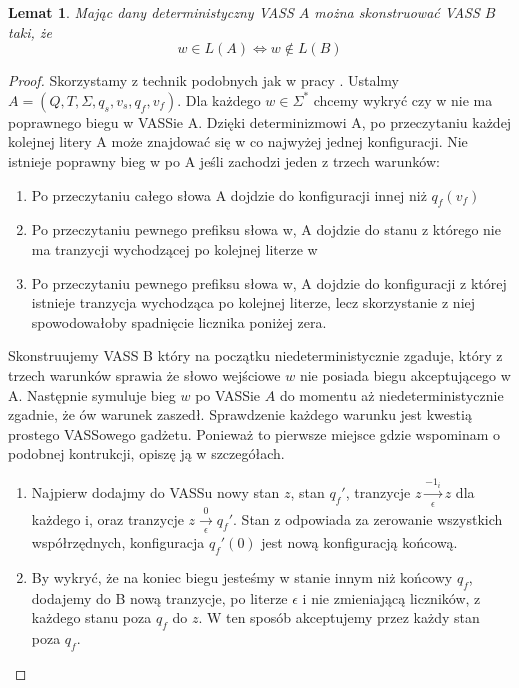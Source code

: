 \documentclass[magisterska]{pracamgr}
\newtheorem{lemma}[theorem]{Lemat}
\newtheorem{proof}[theorem]{Dowód}
\begin{document}
    \begin{lemma}
        \label{det-closure}
        Mając dany deterministyczny VASS $A$ można skonstruować VASS $B$ taki, że
        \[w \in L(A) \Leftrightarrow w \notin L(B)\]
    \end{lemma}
    \begin{proof}
        Skorzystamy z technik podobnych jak w pracy \cite{Czerwinski2022LanguageIF}.
        Ustalmy $A = (Q,T,\Sigma,q_s,v_s,q_f,v_f)$.
        Dla każdego $w \in \Sigma^*$ chcemy wykryć czy w nie ma poprawnego biegu w VASSie A.
        Dzięki determinizmowi A, po przeczytaniu każdej kolejnej litery A może znajdować się w co najwyżej jednej konfiguracji.
        Nie istnieje poprawny bieg w po A jeśli zachodzi jeden z trzech warunków:
        \begin{enumerate}
            \item Po przeczytaniu całego słowa A dojdzie do konfiguracji innej niż $q_f(v_f)$
            \item Po przeczytaniu pewnego prefiksu słowa w, A dojdzie do stanu z którego nie ma tranzycji wychodzącej po kolejnej literze w
            \item Po przeczytaniu pewnego prefiksu słowa w, A dojdzie do konfiguracji z której istnieje tranzycja wychodząca po kolejnej literze,
            lecz skorzystanie z niej spowodowałoby spadnięcie licznika poniżej zera.
        \end{enumerate}

        Skonstruujemy VASS B który na początku niedeterministycznie zgaduje, który z trzech warunków sprawia że słowo wejściowe $w$
        nie posiada biegu akceptującego w A.
        Następnie symuluje bieg $w$ po VASSie $A$ do momentu aż niedeterministycznie zgadnie, że ów warunek zaszedł.
        Sprawdzenie każdego warunku jest kwestią prostego VASSowego gadżetu.
        Ponieważ to pierwsze miejsce gdzie wspominam o podobnej kontrukcji, opiszę ją w szczegółach.
        \begin{enumerate}
            \item Najpierw dodajmy do VASSu nowy stan $z$, stan $q_f'$, tranzycje $z \xrightarrow[\epsilon]{-1_i} z$ dla każdego i,
            oraz tranzycje $z \xrightarrow[\epsilon]{0} q_f'$.
            Stan z odpowiada za zerowanie wszystkich współrzędnych,
            konfiguracja $q_f'(0)$ jest nową konfiguracją końcową.


            \item By wykryć, że na koniec biegu jesteśmy w stanie innym niż końcowy $q_f$, dodajemy do B nową tranzycje,
            po literze $\epsilon$ i nie zmieniającą liczników, z każdego stanu poza $q_f$ do $z$.
            W ten sposób akceptujemy przez każdy stan poza $q_f$.



\end{enumerate}
\end{proof}
\end{document}
